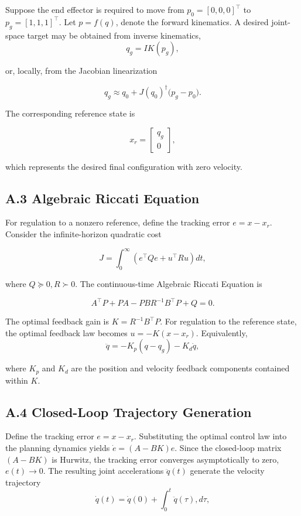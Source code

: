Suppose the end effector is required to move from
\(p_0= [ 0, 0, 0 ]^\top\) to \(p_g=[ 1, 1, 1 ]^\top.\) Let \(p=f(q)\),
denote the forward kinematics. A desired joint-space target may be
obtained from inverse kinematics, \[q_g = IK(p_g), \]

or, locally, from the Jacobian linearization

\[q_g \approx q_0 + J(q_0)^\dagger \bigl(p_g-p_0\bigr). \]

The corresponding reference state is

\[x_r= \begin{bmatrix} q_g \\0 \end{bmatrix},\]

which represents the desired final configuration with zero velocity.

\subsection{A.3 Algebraic Riccati
Equation}\label{a.3-algebraic-riccati-equation}

For regulation to a nonzero reference, define the tracking error
\(e=x-x_r\). Consider the infinite-horizon quadratic cost

\[J = \int_0^\infty \left(e^\top Qe + u^\top Ru \right) dt,\]

where \(Q\succeq0, R\succ0.\) The continuous-time Algebraic Riccati
Equation is

\[A^\top P + PA - PBR^{-1}B^\top P + Q = 0.\]

The optimal feedback gain is \(K =R^{-1}B^\top P.\) For regulation to
the reference state, the optimal feedback law becomes \(u=-K(x-x_r).\)
Equivalently, \[ \ddot q = -K_p(q-q_g) - K_d\dot q,\]

where \(K_p\) and \(K_d\) are the position and velocity feedback
components contained within \(K\).

\subsection{A.4 Closed-Loop Trajectory
Generation}\label{a.4-closed-loop-trajectory-generation}

Define the tracking error \(e=x-x_r.\) Substituting the optimal control
law into the planning dynamics yields \(\dot e = (A-BK)e.\) Since the
closed-loop matrix \((A-BK)\) is Hurwitz, the tracking error converges
asymptotically to zero, \(e(t)\rightarrow0.\) The resulting joint
accelerations \(\ddot q(t)\) generate the velocity trajectory
\[\dot q(t) = \dot q(0) + \int_0^t \ddot q(\tau),d\tau,\]

